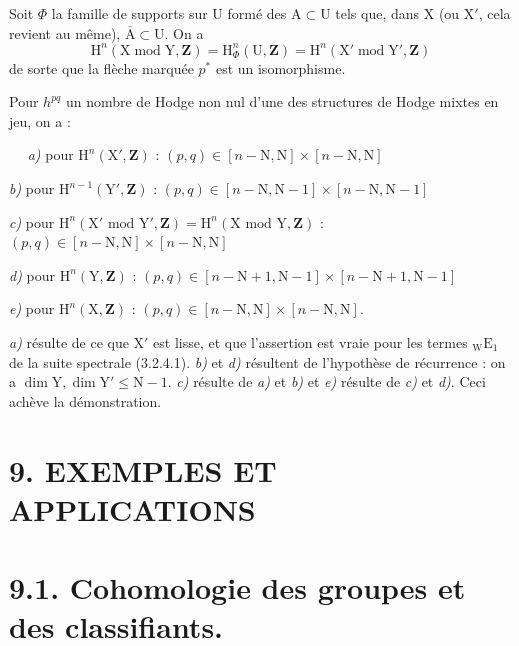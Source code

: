 \documentclass[11pt,leqno]{article}
\newcommand{\Page}[1]{\ifvmode\noindent\else\unskip\ \fi{\footnotesize\textcolor{gray}{[p.\,#1]}}\ \ignorespaces}
\begin{document}
Soit \(\Phi\) la famille de supports sur \(\mathrm{U}\) formé des \(\mathrm{A}\subset\mathrm{U}\) tels que, dans \(\mathrm{X}\) (ou \(\mathrm{X}'\), cela revient au même), \(\overline{\mathrm{A}}\subset\mathrm{U}\). On a
\[
\mathrm{H}^n(\mathrm{X}\operatorname{mod}\mathrm{Y},\mathbf{Z})
=\mathrm{H}^n_\Phi(\mathrm{U},\mathbf{Z})
=\mathrm{H}^n(\mathrm{X}'\operatorname{mod}\mathrm{Y}',\mathbf{Z})
\]
de sorte que la flèche marquée \(p^*\) est un isomorphisme.

Pour \(h^{pq}\) un nombre de Hodge non nul d’une des structures de Hodge mixtes en jeu, on a :

\Page{45}
\noindent\textit{a)} pour \(\mathrm{H}^{n}(\mathrm{X}',\mathbf{Z})\) : \((p,q)\in[n-\mathrm{N},\mathrm{N}]\times[n-\mathrm{N},\mathrm{N}]\)

\noindent\textit{b)} pour \(\mathrm{H}^{n-1}(\mathrm{Y}',\mathbf{Z})\) : \((p,q)\in[n-\mathrm{N},\mathrm{N}-1]\times[n-\mathrm{N},\mathrm{N}-1]\)

\noindent\textit{c)} pour \(\mathrm{H}^{n}(\mathrm{X}'\text{ mod }\mathrm{Y}',\mathbf{Z})=\mathrm{H}^{n}(\mathrm{X}\text{ mod }\mathrm{Y},\mathbf{Z})\) : \((p,q)\in[n-\mathrm{N},\mathrm{N}]\times[n-\mathrm{N},\mathrm{N}]\)

\noindent\textit{d)} pour \(\mathrm{H}^{n}(\mathrm{Y},\mathbf{Z})\) : \((p,q)\in[n-\mathrm{N}+1,\mathrm{N}-1]\times[n-\mathrm{N}+1,\mathrm{N}-1]\)

\noindent\textit{e)} pour \(\mathrm{H}^{n}(\mathrm{X},\mathbf{Z})\) : \((p,q)\in[n-\mathrm{N},\mathrm{N}]\times[n-\mathrm{N},\mathrm{N}]\).

\textit{a)} résulte de ce que \(\mathrm{X}'\) est lisse, et que l’assertion est vraie pour les termes \({}_{\mathrm{W}}\mathrm{E}_{1}\) de la suite spectrale (3.2.4.1). \textit{b)} et \textit{d)} résultent de l’hypothèse de récurrence : on a \(\dim\mathrm{Y},\dim\mathrm{Y}'\leq\mathrm{N}-1\). \textit{c)} résulte de \textit{a)} et \textit{b)} et \textit{e)} résulte de \textit{c)} et \textit{d)}. Ceci achève la démonstration.

\section*{9. EXEMPLES ET APPLICATIONS}

\section*{9.1. Cohomologie des groupes et des classifiants.}
\end{document}

